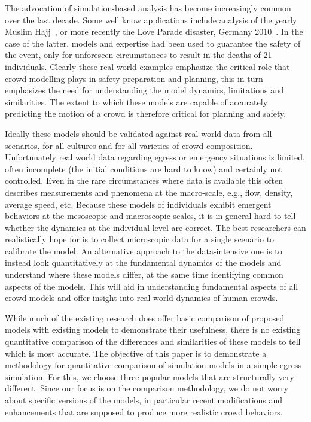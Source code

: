 The advocation of simulation-based analysis has become increasingly common over the last decade. Some well know applications include analysis of the yearly Muslim Hajj~\cite{Hughes:2003}, or more recently the Love Parade disaster, Germany 2010~\cite{Helbing:2012}. In the case of the latter, models and expertise had been used to guarantee the safety of the event, only for unforeseen circumstances to result in the deaths of 21 individuals. Clearly these real world examples emphasize the critical role that crowd modelling plays in safety preparation and planning, this in turn emphasizes the need for understanding the model dynamics, limitations and similarities. The extent to which these models are capable of accurately predicting the motion of a crowd is therefore critical for planning and safety.

Ideally these models should be validated against real-world data from all scenarios, for all cultures and for all varieties of crowd composition. Unfortunately real world data regarding egress or emergency situations is limited, often incomplete (the initial conditions are hard to know) and certainly not controlled. Even in the rare circumstances where data is available this often describes measurements and phenomena at the macro-scale, e.g., flow, density, average speed, etc. Because these models of individuals exhibit emergent behaviors at the mesoscopic and macroscopic scales, it is in general hard to tell whether the dynamics at the individual level are correct. The best researchers can realistically hope for is to collect microscopic data for a single scenario to calibrate the model. An alternative approach to the data-intensive one is to instead look quantitatively at the fundamental dynamics of the models and understand where these models differ, at the same time identifying common aspects of the models. This will aid in understanding fundamental aspects of all crowd models and offer insight into real-world dynamics of human crowds.

While much of the existing research does offer basic comparison of proposed models with existing models to demonstrate their usefulness, there is no existing quantitative comparison of the differences and similarities of these models to tell which is most accurate. The objective of this paper is to demonstrate a methodology for quantitative comparison of simulation models in a simple egress simulation. For this, we choose three popular models that are structurally very different. Since our focus is on the comparison methodology, we do not worry about specific versions of the models, in particular recent modifications and enhancements that are supposed to produce more realistic crowd behaviors.

